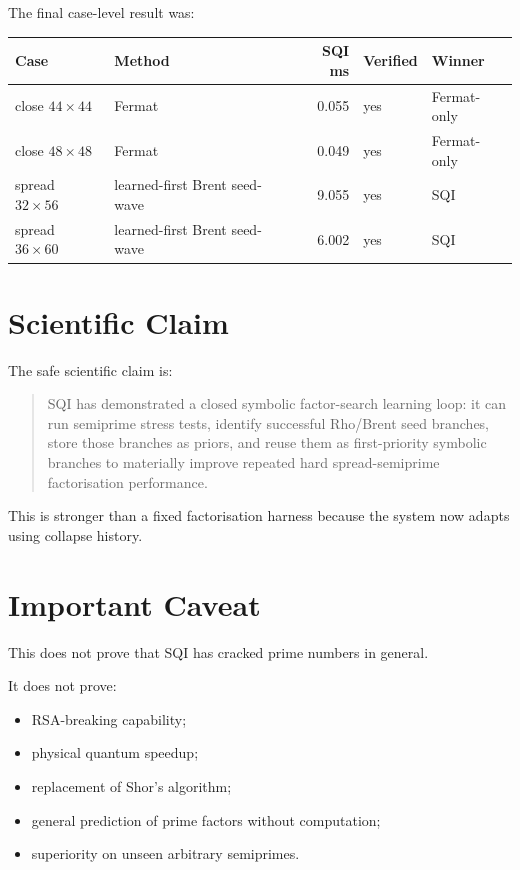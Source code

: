 \documentclass[11pt,a4paper]{article}
\begin{document}
The final case-level result was:

\begin{tabularx}{\textwidth}{@{}l l r l l@{}}
\textbf{Case} & \textbf{Method} & \textbf{SQI ms} & \textbf{Verified} & \textbf{Winner} \\
\hline
close \(44 \times 44\) & Fermat & 0.055 & yes & Fermat-only \\
close \(48 \times 48\) & Fermat & 0.049 & yes & Fermat-only \\
spread \(32 \times 56\) & learned-first Brent seed-wave & 9.055 & yes & SQI \\
spread \(36 \times 60\) & learned-first Brent seed-wave & 6.002 & yes & SQI \\
\end{tabularx}

\section{Scientific Claim}

The safe scientific claim is:

\begin{quote}
SQI has demonstrated a closed symbolic factor-search learning loop: it can run semiprime
stress tests, identify successful Rho/Brent seed branches, store those branches as priors,
and reuse them as first-priority symbolic branches to materially improve repeated hard
spread-semiprime factorisation performance.
\end{quote}

This is stronger than a fixed factorisation harness because the system now adapts using
collapse history.

\section{Important Caveat}

This does not prove that SQI has cracked prime numbers in general.

It does not prove:

\begin{itemize}
  \item RSA-breaking capability;
  \item physical quantum speedup;
  \item replacement of Shor's algorithm;
  \item general prediction of prime factors without computation;
  \item superiority on unseen arbitrary semiprimes.
\end{itemize}
\end{document}
